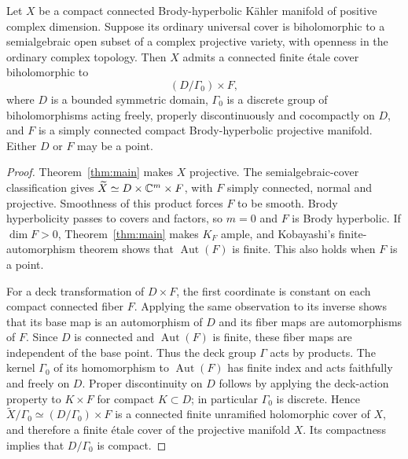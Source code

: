 \begin{corollary}\label{cor:semialgebraic-product}
Let $X$ be a compact connected Brody-hyperbolic K\"ahler manifold of
positive complex dimension. Suppose its ordinary universal cover is
biholomorphic to a semialgebraic open subset of a complex projective
variety, with openness in the ordinary complex topology. Then $X$
admits a connected finite \'etale cover biholomorphic to
\[
                    (D/\Gamma_0)\times F,
\]
where $D$ is a bounded symmetric domain, $\Gamma_0$ is a discrete group
of biholomorphisms acting freely, properly discontinuously and
cocompactly on $D$, and $F$ is a simply connected compact
Brody-hyperbolic projective manifold. Either $D$ or $F$ may be a point.
\end{corollary}
\begin{proof}
Theorem~\ref{thm:main} makes $X$ projective. The semialgebraic-cover
classification \cite[Theorem~1.1]{OpenAISemialgebraicCovers2026} gives
$\widetilde X\simeq D\times\mathbb C^m\times F$, with $F$ simply connected,
normal and projective. Smoothness of this product forces $F$ to be
smooth. Brody hyperbolicity passes to covers and factors, so $m=0$
and $F$ is Brody hyperbolic. If $\dim F>0$, Theorem~\ref{thm:main}
makes $K_F$ ample, and Kobayashi's finite-automorphism theorem
\cite[Theorem, p.~184]{Kobayashi1959} shows that
$\operatorname{Aut}(F)$ is finite. This also holds when $F$ is a point.

For a deck transformation of $D\times F$, the first coordinate is
constant on each compact connected fiber $F$. Applying the same
observation to its inverse shows that its
base map is an automorphism of $D$ and its fiber maps are
automorphisms of $F$. Since $D$ is connected and
$\operatorname{Aut}(F)$ is finite, these fiber maps are independent
of the base point. Thus the deck group $\Gamma$ acts by products.
The kernel $\Gamma_0$ of its homomorphism to
$\operatorname{Aut}(F)$ has finite index and acts faithfully and
freely on $D$. Proper discontinuity on $D$ follows by applying the
deck-action property to $K\times F$ for compact $K\subset D$; in
particular $\Gamma_0$ is discrete. Hence
$\widetilde X/\Gamma_0\simeq(D/\Gamma_0)\times F$ is a connected
finite unramified holomorphic cover of $X$, and therefore a finite
\'etale cover of the projective manifold $X$. Its compactness implies
that $D/\Gamma_0$ is compact.
\end{proof}

